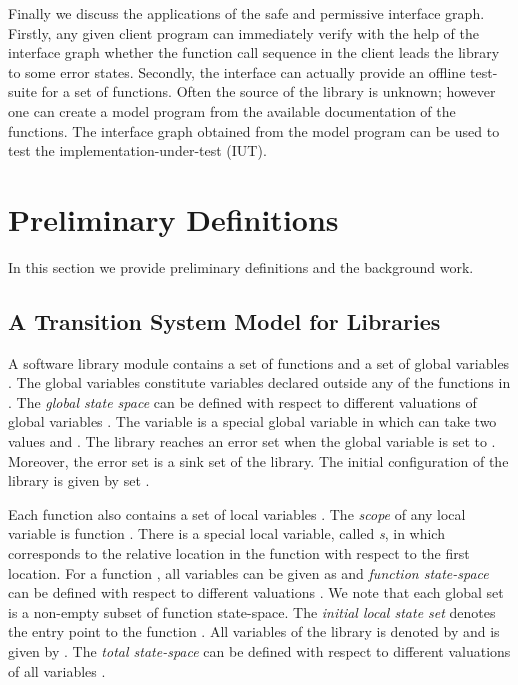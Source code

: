 \documentclass{llncs}
\begin{document}
 Finally we discuss the applications of the safe and permissive interface graph.
 Firstly, any given client program can immediately verify with the help of the interface graph whether the function call sequence in the client leads the library to some error states.
Secondly, the interface can actually provide an offline test-suite for a set of functions.
Often the source of the library is unknown; however one can create a model program from the
available documentation of the functions.
The interface graph obtained from the model program can be used to test the
implementation-under-test (IUT).






















    
   


  


\section{Preliminary Definitions}\label{def}
In this section we provide preliminary definitions and the background work.
\subsection{A Transition System Model for Libraries}
A software library module  contains a set of functions  and a set of 
global variables . 
The global variables  constitute variables declared outside any of the functions in .
The {\em global state space}  can be defined with respect to different valuations of global variables . 
The variable  is a special global variable in  which can take two values 
and .
The library reaches an error set   when the global variable  is set to . 
Moreover, the error set is a sink set of the library.
The initial configuration of the library is given by set .

Each function  also contains a set of local variables .
The {\em scope} of any local variable  is function .
There is a special local variable, called {\em s}, in  which corresponds to the relative location
in the function with respect to the first location. 
For a function , all variables  can be given as  and 
 {\em function state-space}  can be defined with respect to different valuations . 
 We note that each global set  is a non-empty subset of 
 function state-space. 
 The {\em initial local state set}  denotes the entry point to the function . 
All variables of the library  is denoted by  and is given by .
The {\em total state-space}  can be defined with respect to different valuations of all variables .   
\end{document}

